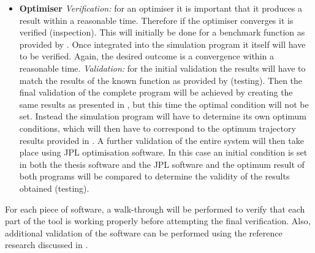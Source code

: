\begin{itemize}
\item \textbf{Optimiser} \textit{Verification:} for an optimiser it is important that it produces a result within a reasonable time. Therefore if the optimiser converges it is verified (inspection). This will initially be done for a benchmark function as provided by \cite{noomen2013}. Once integrated into the simulation program it itself will have to be verified. Again, the desired outcome is a convergence within a reasonable time.  \textit{Validation:} for the initial validation the results will have to match the results of the known function as provided by \cite{noomen2013} (testing). Then the final validation of the complete program will be achieved by creating the same results as presented in \cite{woolley2011mars}, but this time the optimal condition will not be set. Instead the simulation program will have to determine its own optimum conditions, which will then have to correspond to the optimum trajectory results provided in \cite{woolley2011mars}. A further validation of the entire system will then take place using \ac{JPL} optimisation software. In this case an initial condition is set in both the thesis software and the \ac{JPL} software and the optimum result of both programs will be compared to determine the validity of the results obtained (testing).
\end{itemize}

For each piece of software, a walk-through will be performed to verify that each part of the tool is working properly before attempting the final verification. Also, additional validation of the software can be performed using the reference research discussed in .

























